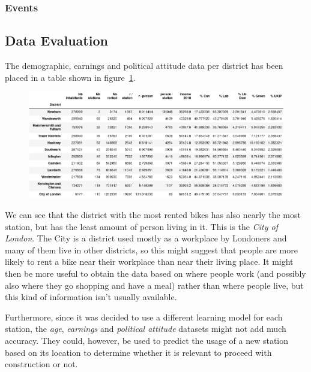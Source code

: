 \subsubsection{Events}
\subsection{Data Evaluation}

The demographic, earnings and political attitude data per district has been
placed in a table shown in figure~\ref{fig:addition_features}.
\begin{figure}[H]
\centering
\includegraphics[width=\textwidth]{img/additional_features}\label{fig:addition_features}
\label{fig:addition_features}
\end{figure}

We can see that the district with the most rented bikes has also nearly the most
station, but has the least amount of person living in it. This is the \emph{City
of London}.
The City is a district used mostly as a workplace by Londoners and many of them
live in other districts, so this might suggest that people are more likely to
rent a bike near their workplace than near their living place.
It might then be more useful to obtain the data based on where people work
(and possibly also where they go shopping and have a meal) rather than where
people live, but this kind of information isn't usually available.

Furthermore, since it was decided to use a different learning model for each station,
the \emph{age}, \emph{earnings} and \emph{political attitude} datasets might not add
much accuracy. They could, however, be used to predict the usage of a new station
based on its location to determine whether it is relevant to proceed with construction
or not.

